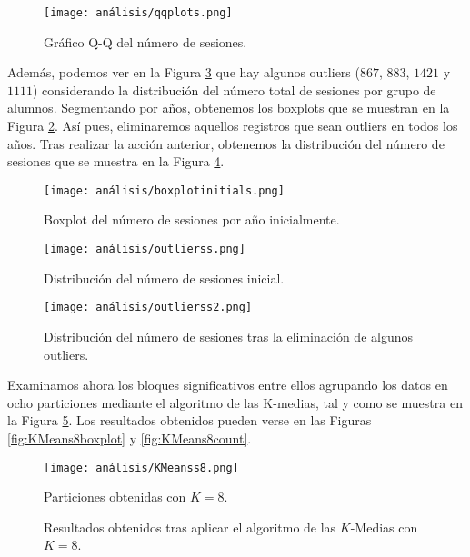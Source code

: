 \begin{figure}[H]
    \centering
    \texttt{[image: análisis/qqplots.png]}
    \caption{Gráfico Q-Q del número de sesiones.}
    \label{fig:q-qsessions}
\end{figure}

Además, podemos ver en la Figura \ref{fig:outlierss} que hay algunos outliers ($867$, $883$, $1421$ y $1111$) considerando la distribución del número total de sesiones por grupo de alumnos. Segmentando por años, obtenemos los boxplots que se muestran en la Figura \ref{fig:boxplotsessionsyearinitial}. Así pues, eliminaremos aquellos registros que sean outliers en todos los años. Tras realizar la acción anterior, obtenemos la distribución del número de sesiones que se muestra en la Figura \ref{fig:outlierss2}.

\begin{figure}[H]
    \centering
    \texttt{[image: análisis/boxplotinitials.png]}
    \caption{Boxplot del número de sesiones por año inicialmente.}
    \label{fig:boxplotsessionsyearinitial}
\end{figure}

\begin{figure}[H]
    \centering
    \texttt{[image: análisis/outlierss.png]}
    \caption{Distribución del número de sesiones inicial.}
    \label{fig:outlierss}
\end{figure}

\begin{figure}[H]
    \centering
    \texttt{[image: análisis/outlierss2.png]}
    \caption{Distribución del número de sesiones tras la eliminación de algunos outliers.}
    \label{fig:outlierss2}
\end{figure}

Examinamos ahora los bloques significativos entre ellos agrupando los datos en ocho particiones mediante el algoritmo de las K-medias, tal y como se muestra en la Figura \ref{fig:KMeans8}. Los resultados obtenidos pueden verse en las Figuras \ref{fig:KMeans8boxplot} y \ref{fig:KMeans8count}.

\begin{figure}[H]
    \centering
    \texttt{[image: análisis/KMeanss8.png]}
    \caption{Particiones obtenidas con $K = 8$.}
    \label{fig:KMeans8}
\end{figure}

\begin{figure}[H]
\centering
{}\qquad
{}%
\caption{Resultados obtenidos tras aplicar el algoritmo de las $K$-Medias con $K = 8$.}
\label{fig:KMeans8details}
\end{figure}

